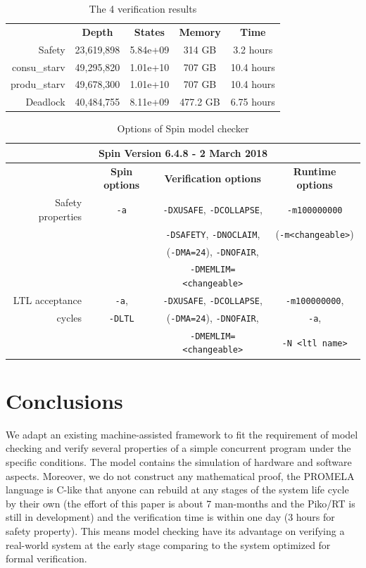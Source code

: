 \begin{table}
\caption{The 4 verification results}
\label{tab:verification}
\begin{tabular}{rcccc}
\toprule
 & \textbf{Depth} & \textbf{States} & \textbf{Memory} & \textbf{Time} \\
 \cmidrule{2-5}
Safety & 23,619,898 & 5.84e+09 & 314 GB & 3.2 hours \\
 \cmidrule{2-5}
consu\_starv & 49,295,820 & 1.01e+10 & 707 GB & 10.4 hours \\
 \cmidrule{2-5}
produ\_starv & 49,678,300 & 1.01e+10 & 707 GB & 10.4 hours \\
 \cmidrule{2-5}
Deadlock & 40,484,755 & 8.11e+09 & 477.2 GB & 6.75 hours \\
\bottomrule
\end{tabular}
\end{table}

\begin{table}
\caption{Options of Spin model checker}
\label{tab:spinv}
\begin{tabular}{rccc}
\toprule
\multicolumn{4}{c}{Spin Version 6.4.8 - 2 March 2018} \\
\midrule
 & \textbf{Spin options} & \textbf{Verification options} & \textbf{Runtime options} \\
 \cmidrule{2-4}
Safety properties & \texttt{-a} & \texttt{-DXUSAFE}, \texttt{-DCOLLAPSE}, & \texttt{-m100000000} \\
& & \texttt{-DSAFETY}, \texttt{-DNOCLAIM}, & (\texttt{-m<changeable>}) \\
& & (\texttt{-DMA=24}), \texttt{-DNOFAIR}, & \\
& & \texttt{-DMEMLIM=<changeable>} & \\
\cmidrule{2-4}
LTL acceptance & \texttt{-a}, & \texttt{-DXUSAFE}, \texttt{-DCOLLAPSE}, & \texttt{-m100000000}, \\
cycles & \texttt{-DLTL} & (\texttt{-DMA=24}), \texttt{-DNOFAIR}, & \texttt{-a}, \\
& & \texttt{-DMEMLIM=<changeable>} & \texttt{-N <ltl name>} \\
\bottomrule
\end{tabular}
\end{table}

\section{Conclusions}
We adapt an existing machine-assisted framework to fit the requirement of model checking and verify several properties of a simple concurrent program under the specific conditions. The model contains the simulation of hardware and software aspects. Moreover, we do not construct any mathematical proof, the PROMELA language is C-like that anyone can rebuild at any stages of the system life cycle by their own (the effort of this paper is about 7 man-months and the Piko/RT is still in development) and the verification time is within one day (3 hours for safety property). This means model checking have its advantage on verifying a real-world system at the early stage comparing to the system optimized for formal verification.
